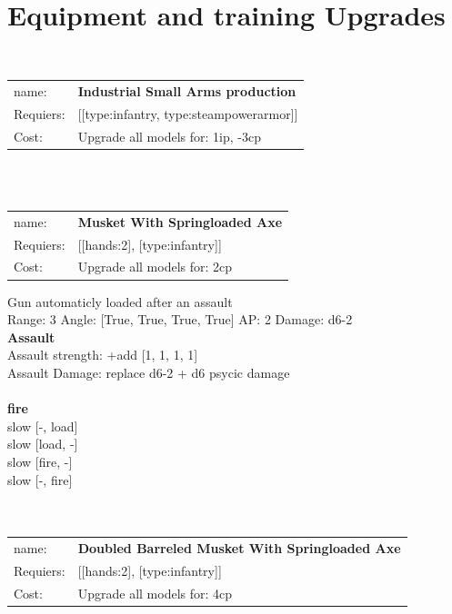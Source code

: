  
\ \\

\section{Equipment and training Upgrades}\ \\
\begin{tabular}{ll}
name: & {\bf Industrial Small Arms production } \\
Requiers: & [[type:infantry, type:steampowerarmor]] \\
Cost: & Upgrade all models for: 1ip, -3cp \\
\end{tabular}










\ \\
\ \\
\begin{tabular}{ll}
name: & {\bf Musket With Springloaded Axe } \\
Requiers: & [[hands:2], [type:infantry]] \\
Cost: & Upgrade all models for: 2cp \\
\end{tabular}

Gun automaticly loaded after an assault\\ 


Range: 3  Angle: [True, True, True, True] AP: 2 Damage: d6-2 \\



{\bf Assault} \ \\
Assault strength: +add [1, 1, 1, 1] 
\\ 
Assault Damage: replace d6-2 + d6 psycic damage
\\ 



\ \\ {\bf fire } \\
slow [-, load] \\
slow [load, -] \\
slow [fire, -] \\
slow [-, fire] \\

\ \\
\ \\
\begin{tabular}{ll}
name: & {\bf Doubled Barreled Musket With Springloaded Axe } \\
Requiers: & [[hands:2], [type:infantry]] \\
Cost: & Upgrade all models for: 4cp \\
\end{tabular}

